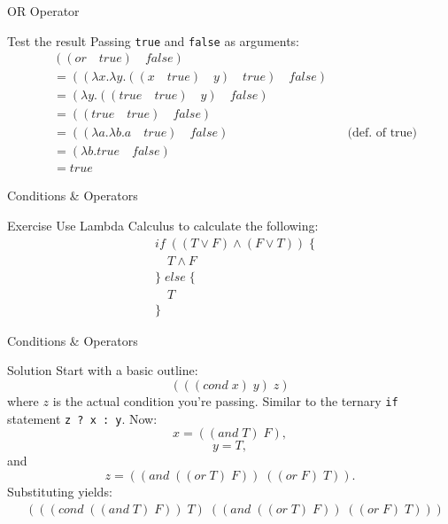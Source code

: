 \documentclass{beamer}
\begin{document}
\begin{frame}{OR Operator}
\begin{block}{Test the result}
Passing \texttt{true} and \texttt{false} as arguments:
\begin{align*}
    &((or \quad true) \quad false) && \\
    &= ((\lambda x . \lambda y . ((x \quad true) \quad y) \quad true) \quad false) &&\\
    &= (\lambda y . ((true \quad true) \quad y) \quad false) &&\\
    &= ((true \quad true) \quad false) &&\\
    &= ((\lambda a . \lambda b . a \quad true) \quad false) && \text{(def. of true)}\\
    &= (\lambda b . true \quad false) &&\\
    &= true &&
\end{align*}
\end{block}
\end{frame}

\begin{frame}{Conditions \& Operators}
\begin{block}{Exercise}
Use Lambda Calculus to calculate the following:
\begin{align*}
	&if\;((T \vee F) \wedge (F \vee T))\;\{ \\
    &\quad T \wedge F \\
    &\} \; else \; \{ \\
    &\quad T \\
    &\}
\end{align*}
\end{block}
\end{frame}

\begin{frame}{Conditions \& Operators}
\begin{block}{Solution}
Start with a basic outline: $$(((cond \; x) \; y) \; z)$$ where $z$ is the actual condition you're passing. Similar to the ternary \texttt{if} statement \texttt{z ? x : y}. Now: $$x = ((and \; T) \; F),$$ $$y = T,$$ and $$z = ((and \; ((or \; T) \; F)) \; ((or \; F) \; T)).$$ Substituting yields:
\begin{align}
	&(((cond \; ((and \; T) \; F)) \; T) \; ((and \; ((or \; T) \; F)) \; ((or \; F) \; T)))
\end{align}
\end{block}
\end{frame}
\end{document}
